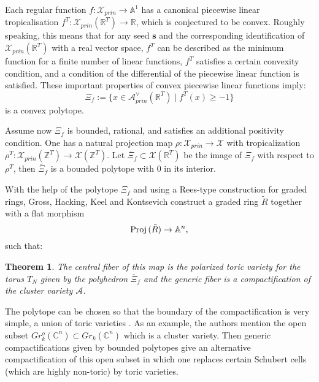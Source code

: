 \documentclass{emsprocart}
\newtheorem{theorem}{Theorem}[section]
\theoremstyle{definition}
\begin{document}
%

Each regular function $f:{\mathcal X}_{prin}\rightarrow \mathbb A^1$ has a canonical piecewise linear
tropicalisation $f^T:{\mathcal X}_{prin}(\mathbb R^T)\rightarrow \mathbb R$, which is conjectured to be convex.
Roughly speaking, this means that for any seed $\mathbf s$ and the corresponding identification of
${\mathcal X}_{prin}(\mathbb R^T)$ with a real vector space, $f^T$ can be described as the minimum function
for a finite number of linear functions, $f^T$ satisfies a certain convexity condition, and a condition of the differential
of the piecewise linear function is satisfied. These important properties of convex piecewise linear functions imply:
\begin{equation}\label{clusterpolytope}
\Xi_f:=\{x\in \mathcal A^\vee_{prin}(\mathbb R^T)\mid f^T(x)\ge -1\}
\end{equation}
is a convex polytope.

Assume now $\Xi_f$ is bounded, rational, and satisfies an additional positivity condition. One has a natural projection map 
$\rho : \mathcal X_{prin}\rightarrow \mathcal X$  with tropicalization
$\rho^T:\mathcal X_{prin}(\mathbb Z^T ) \rightarrow \mathcal X(\mathbb Z^T )$. Let
$\overline{\Xi}_f\subset \mathcal X(\mathbb R^T)$ be the image of $\Xi_f$ with respect to $\rho^T$, then $\overline{\Xi}_f$
is a bounded polytope with $0$ in its interior.

With the help of the polytope $\Xi_f$ and using a Rees-type construction for graded rings, Gross, Hacking, Keel and Kontsevich construct a graded ring $\tilde R$ 
together with a flat morphism 
\begin{equation}\label{flatfamily}
{\rm Proj\,}(\tilde R)\rightarrow \mathbb A^n,
\end{equation}
such that:
\begin{theorem}\cite{GHKK}\label{GHKKfibration}
The central fiber of this map is the polarized toric variety for the torus $T_{N}$ given by the polyhedron $\overline{\Xi}_f$
and the generic fiber is a compactification of the cluster variety $\mathcal A$.
\end{theorem}
The polytope can be chosen so that the boundary of the compactification is very
simple, a union of toric varieties \cite{GHKK}. As an example, the authors mention the
open subset $Gr^o_k(\mathbb C^n)\subset Gr_k(\mathbb C^n)$
which is a cluster variety. Then generic compactifications given by bounded
polytopes give an alternative compactification of this open subset in which one replaces certain Schubert
cells (which are highly non-toric) by toric varieties.
\end{document}
